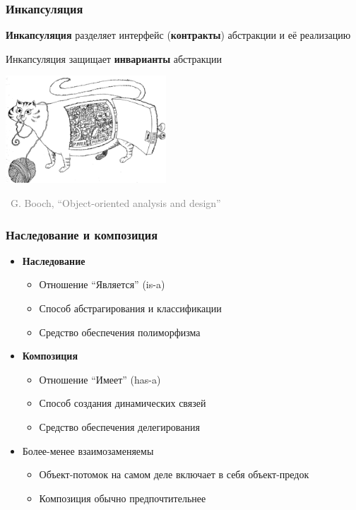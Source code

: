 \documentclass[xetex,mathserif,serif]{beamer}
\newcommand{\attribution}[1] {
    \begin{flushright}\begin{scriptsize}\textcolor{gray}{\textcopyright\, #1}\end{scriptsize}\end{flushright}
}
\begin{document}
    \begin{frame}
        \frametitle{Инкапсуляция}
        \textbf{Инкапсуляция} разделяет интерфейс (\textbf{контракты}) абстракции и её реализацию

        Инкапсуляция защищает \textbf{инварианты} абстракции
        \vskip 1cm
        \begin{center}
            \includegraphics[width=0.45\textwidth]{incapsulation.png}
        \end{center}
        \attribution{G. Booch, ``Object-oriented analysis and design''}
    \end{frame}

    \begin{frame}
        \frametitle{Наследование и композиция}
        \begin{itemize}
            \item \textbf{Наследование}
            \begin{itemize}
                \item Отношение ``Является'' (is-a)
                \item Способ абстрагирования и классификации
                \item Средство обеспечения полиморфизма
            \end{itemize}
            \item \textbf{Композиция}
            \begin{itemize}
                \item Отношение ``Имеет'' (has-a)
                \item Способ создания динамических связей
                \item Средство обеспечения делегирования
            \end{itemize}
            \item Более-менее взаимозаменяемы
            \begin{itemize}
                \item Объект-потомок на самом деле включает в себя объект-предок
                \item Композиция обычно предпочтительнее
            \end{itemize}
        \end{itemize}
    \end{frame}
\end{document}
